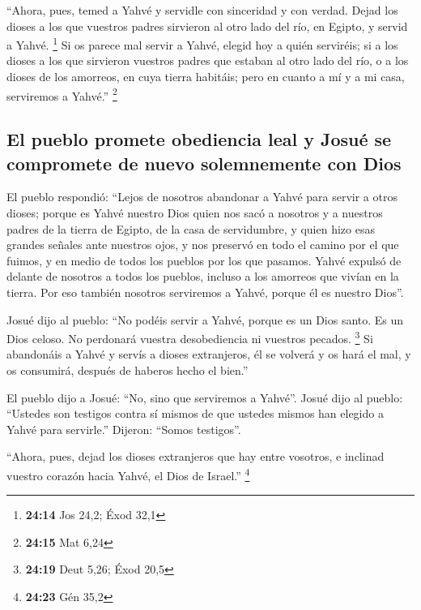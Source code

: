  ``Ahora, pues, temed a Yahvé y servidle con sinceridad y
con verdad. Dejad los dioses a los que vuestros padres sirvieron al otro
lado del río, en Egipto, y servid a Yahvé. \footnote{\textbf{24:14} Jos
  24,2; Éxod 32,1}  Si os parece mal servir a Yahvé,
elegid hoy a quién serviréis; si a los dioses a los que sirvieron
vuestros padres que estaban al otro lado del río, o a los dioses de los
amorreos, en cuya tierra habitáis; pero en cuanto a mí y a mi casa,
serviremos a Yahvé.'' \footnote{\textbf{24:15} Mat 6,24}

\hypertarget{el-pueblo-promete-obediencia-leal-y-josuuxe9-se-compromete-de-nuevo-solemnemente-con-dios}{%
\subsection{El pueblo promete obediencia leal y Josué se compromete de
nuevo solemnemente con
Dios}\label{el-pueblo-promete-obediencia-leal-y-josuuxe9-se-compromete-de-nuevo-solemnemente-con-dios}}

 El pueblo respondió: ``Lejos de nosotros abandonar a
Yahvé para servir a otros dioses;  porque es Yahvé
nuestro Dios quien nos sacó a nosotros y a nuestros padres de la tierra
de Egipto, de la casa de servidumbre, y quien hizo esas grandes señales
ante nuestros ojos, y nos preservó en todo el camino por el que fuimos,
y en medio de todos los pueblos por los que pasamos. 
Yahvé expulsó de delante de nosotros a todos los pueblos, incluso a los
amorreos que vivían en la tierra. Por eso también nosotros serviremos a
Yahvé, porque él es nuestro Dios''.

 Josué dijo al pueblo: ``No podéis servir a Yahvé, porque
es un Dios santo. Es un Dios celoso. No perdonará vuestra desobediencia
ni vuestros pecados. \footnote{\textbf{24:19} Deut 5,26; Éxod 20,5}
 Si abandonáis a Yahvé y servís a dioses extranjeros, él
se volverá y os hará el mal, y os consumirá, después de haberos hecho el
bien.''

 El pueblo dijo a Josué: ``No, sino que serviremos a
Yahvé''.  Josué dijo al pueblo: ``Ustedes son testigos
contra sí mismos de que ustedes mismos han elegido a Yahvé para
servirle.'' Dijeron: ``Somos testigos''.

 ``Ahora, pues, dejad los dioses extranjeros que hay
entre vosotros, e inclinad vuestro corazón hacia Yahvé, el Dios de
Israel.'' \footnote{\textbf{24:23} Gén 35,2}

